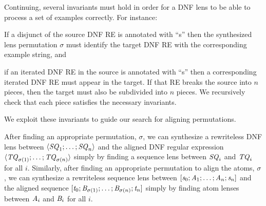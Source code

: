 \documentclass[numbers,10pt,preprint\ifanon ,nocopyrightspace\fi]{sigplanconf}
\begin{document}
Continuing, several invariants must hold in order
for a DNF lens to be able to process a set of examples correctly. 
For instance:
\begin{enumerate*}[label=(\arabic*) ]
\item If a disjunct of the source DNF RE is annotated with
  ``s'' then the synthesized lens permutation $\sigma$ must identify the
  target DNF RE with the corresponding example string, and



\item if an iterated DNF RE in the source is annotated with ``s'' then
  a corresponding iterated DNF RE must appear in the target.  If that
  RE breaks the source into $n$ pieces, then the target must also be
 subdivided into $n$ pieces.  We recursively check that each piece satisfies
 the necessary invariants.
\end{enumerate*}
We exploit these invariants to guide our search for aligning permutations.


After finding an appropriate permutation, $\sigma$,  we can
synthesize a rewriteless DNF lens between
$\langle\mathit{SQ}_1;\ldots;\mathit{SQ}_n\rangle$ and the aligned DNF regular expression
$\langle\mathit{TQ}_{\sigma(1)};\ldots;\mathit{TQ}_{\sigma(n)}\rangle$ simply by finding a
sequence lens between $\mathit{SQ}_i$ and $\mathit{TQ}_i$ for all $i$. 
Similarly, after finding an appropriate permutation to align the
atoms, $\sigma$,  we can synthesize a rewriteless sequence lens
between $[\mathit{s}_0;\mathit{A}_1;\ldots;\mathit{A}_n;\mathit{s}_n]$ and
the aligned sequence
$[\mathit{t}_0;\mathit{B}_{\sigma(1)};\ldots;\mathit{B}_{\sigma(n)};\mathit{t}_n]$
simply by finding atom lenses between $\mathit{A}_i$ and $\mathit{B}_i$ for
all $i$.
\end{document}
